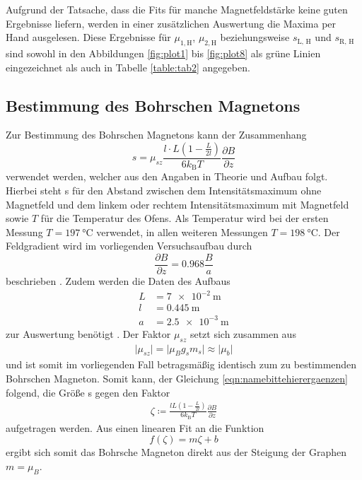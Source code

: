 Aufgrund der Tatsache, dass die Fits für manche Magnetfeldstärke keine guten Ergebnisse liefern, werden in einer zusätzlichen Auswertung die Maxima per Hand ausgelesen.
Diese Ergebnisse für $\mu_{1, \text{H}}$, $\mu_{2, \text{H}}$ beziehungsweise $s_\text{L, H}$ und $s_\text{R, H}$ sind sowohl in den Abbildungen \ref{fig:plot1} bis \ref{fig:plot8} als grüne Linien eingezeichnet als auch in Tabelle \ref{table:tab2} angegeben.


\subsection{Bestimmung des Bohrschen Magnetons}

Zur Bestimmung des Bohrschen Magnetons kann der Zusammenhang
\begin{equation}
  \label{eqn:namebittehierergaenzen}
  s = \mu_{sz} \frac{l \cdot L \left( 1 - \frac{L}{2l} \right)}{6 k_\text{B} T} \frac{\partial B}{\partial z}
\end{equation}
verwendet werden, welcher aus den Angaben in Theorie und Aufbau folgt.
Hierbei steht s für den Abstand zwischen dem Intensitätsmaximum ohne Magnetfeld und dem linkem oder rechtem Intensitätsmaximum mit Magnetfeld sowie $T$ für die Temperatur des Ofens.
Als Temperatur wird bei der ersten Messung $T = \SI{197}{\celsius}$ verwendet, in allen weiteren Messungen $T = \SI{198}{\celsius}$.
Der Feldgradient wird im vorliegenden Versuchsaufbau durch
\begin{equation}
  \frac{\partial B}{\partial z} = \num{0.968} \frac{B}{a}
\end{equation}
beschrieben \cite{skript}.
Zudem werden die Daten des Aufbaus
\begin{align*}
  L &= \SI{7e-2}{\metre}\\
  l &= \SI{0.445}{\metre}\\
  a &= \SI{2.5e-3}{\metre}
\end{align*}
zur Auswertung benötigt \cite{skript}.
Der Faktor $\mu_{sz}$ setzt sich zusammen aus
\begin{align*}
  \lvert \mu_{sz} \rvert = \lvert \mu_B g_s m_s \rvert \approx \lvert \mu_b \rvert
\end{align*}
und ist somit im vorliegenden Fall betragsmäßig identisch zum zu bestimmenden Bohrschen Magneton.
Somit kann, der Gleichung \eqref{eqn:namebittehierergaenzen} folgend, die Größe s gegen den Faktor
\begin{align*}
  \zeta \coloneq \frac{l L \left( 1 - \frac{L}{2l} \right)}{6 k_\text{B} T} \frac{\partial B}{\partial z}
\end{align*}
aufgetragen werden.
Aus einen linearen Fit an die Funktion
\begin{equation}
  f(\zeta) = m \zeta + b
\end{equation}
ergibt sich somit das Bohrsche Magneton direkt aus der Steigung der Graphen $m = \mu_B$.


